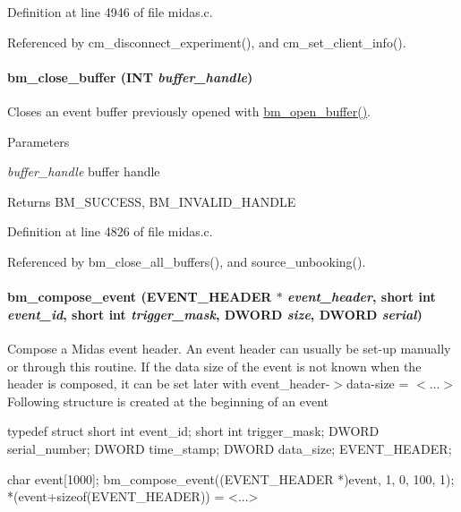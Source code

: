 Definition at line 4946 of file midas.c.

Referenced by cm\_\-disconnect\_\-experiment(), and cm\_\-set\_\-client\_\-info().
\paragraph[{bm\_\-close\_\-buffer}]{ bm\_\-close\_\-buffer ({\bf INT} {\em buffer\_\-handle})}\hfill\label{group__bmfunctionc_ga7b2cbde6caa572dfc978c780d63ab6be}
Closes an event buffer previously opened with \hyperlink{group__bmfunctionc_gae9636ff3e34ee94e31cb292bd07a679d}{bm\_\-open\_\-buffer()}. 
\begin{DoxyParams}{Parameters}
\item[{\em buffer\_\-handle}]buffer handle \end{DoxyParams}
\begin{DoxyReturn}{Returns}
BM\_\-SUCCESS, BM\_\-INVALID\_\-HANDLE 
\end{DoxyReturn}


Definition at line 4826 of file midas.c.

Referenced by bm\_\-close\_\-all\_\-buffers(), and source\_\-unbooking().
\paragraph[{bm\_\-compose\_\-event}]{ bm\_\-compose\_\-event ({\bf EVENT\_\-HEADER} $\ast$ {\em event\_\-header}, \/  short int {\em event\_\-id}, \/  short int {\em trigger\_\-mask}, \/  {\bf DWORD} {\em size}, \/  {\bf DWORD} {\em serial})}\hfill\label{group__bmfunctionc_gac5e3e469fb6721a502ebd80a35a328f5}
Compose a Midas event header. An event header can usually be set-\/up manually or through this routine. If the data size of the event is not known when the header is composed, it can be set later with event\_\-header-\/$>$data-\/size = $<$...$>$ Following structure is created at the beginning of an event 
\begin{DoxyCode}
typedef struct {
 short int     event_id;
 short int     trigger_mask;
 DWORD         serial_number;
 DWORD         time_stamp;
 DWORD         data_size;
} EVENT_HEADER;

char event[1000];
 bm_compose_event((EVENT_HEADER *)event, 1, 0, 100, 1);
 *(event+sizeof(EVENT_HEADER)) = <...>
\end{DoxyCode}
 
